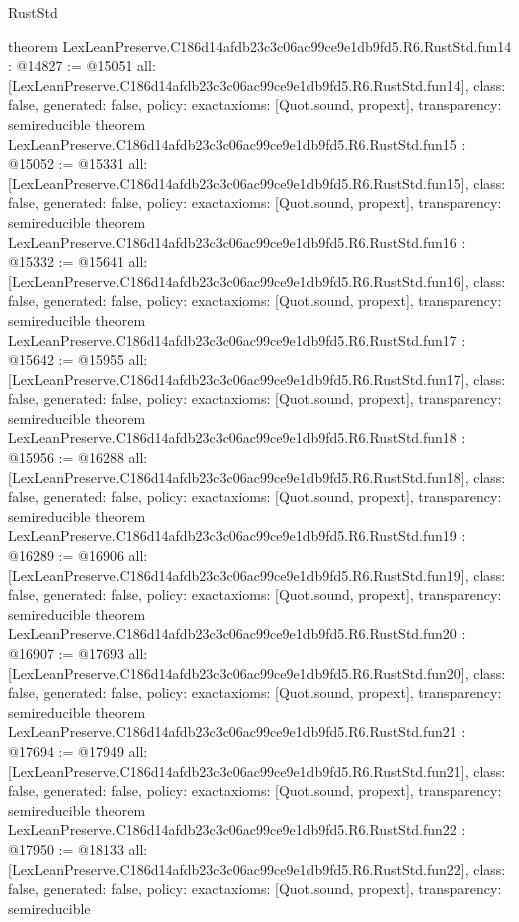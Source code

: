 \begin{lexlean}{RustStd}
\begin{coremodule}
{}
theorem LexLeanPreserve.C186d14afdb23c3c06ac99ce9e1db9fd5.R6.RustStd.fun14 : @14827 := @15051 {
  all: [LexLeanPreserve.C186d14afdb23c3c06ac99ce9e1db9fd5.R6.RustStd.fun14],
  class: false,
  generated: false,
  policy: exact{axioms: [Quot.sound, propext]},
  transparency: semireducible
}
theorem LexLeanPreserve.C186d14afdb23c3c06ac99ce9e1db9fd5.R6.RustStd.fun15 : @15052 := @15331 {
  all: [LexLeanPreserve.C186d14afdb23c3c06ac99ce9e1db9fd5.R6.RustStd.fun15],
  class: false,
  generated: false,
  policy: exact{axioms: [Quot.sound, propext]},
  transparency: semireducible
}
theorem LexLeanPreserve.C186d14afdb23c3c06ac99ce9e1db9fd5.R6.RustStd.fun16 : @15332 := @15641 {
  all: [LexLeanPreserve.C186d14afdb23c3c06ac99ce9e1db9fd5.R6.RustStd.fun16],
  class: false,
  generated: false,
  policy: exact{axioms: [Quot.sound, propext]},
  transparency: semireducible
}
theorem LexLeanPreserve.C186d14afdb23c3c06ac99ce9e1db9fd5.R6.RustStd.fun17 : @15642 := @15955 {
  all: [LexLeanPreserve.C186d14afdb23c3c06ac99ce9e1db9fd5.R6.RustStd.fun17],
  class: false,
  generated: false,
  policy: exact{axioms: [Quot.sound, propext]},
  transparency: semireducible
}
theorem LexLeanPreserve.C186d14afdb23c3c06ac99ce9e1db9fd5.R6.RustStd.fun18 : @15956 := @16288 {
  all: [LexLeanPreserve.C186d14afdb23c3c06ac99ce9e1db9fd5.R6.RustStd.fun18],
  class: false,
  generated: false,
  policy: exact{axioms: [Quot.sound, propext]},
  transparency: semireducible
}
theorem LexLeanPreserve.C186d14afdb23c3c06ac99ce9e1db9fd5.R6.RustStd.fun19 : @16289 := @16906 {
  all: [LexLeanPreserve.C186d14afdb23c3c06ac99ce9e1db9fd5.R6.RustStd.fun19],
  class: false,
  generated: false,
  policy: exact{axioms: [Quot.sound, propext]},
  transparency: semireducible
}
theorem LexLeanPreserve.C186d14afdb23c3c06ac99ce9e1db9fd5.R6.RustStd.fun20 : @16907 := @17693 {
  all: [LexLeanPreserve.C186d14afdb23c3c06ac99ce9e1db9fd5.R6.RustStd.fun20],
  class: false,
  generated: false,
  policy: exact{axioms: [Quot.sound, propext]},
  transparency: semireducible
}
theorem LexLeanPreserve.C186d14afdb23c3c06ac99ce9e1db9fd5.R6.RustStd.fun21 : @17694 := @17949 {
  all: [LexLeanPreserve.C186d14afdb23c3c06ac99ce9e1db9fd5.R6.RustStd.fun21],
  class: false,
  generated: false,
  policy: exact{axioms: [Quot.sound, propext]},
  transparency: semireducible
}
theorem LexLeanPreserve.C186d14afdb23c3c06ac99ce9e1db9fd5.R6.RustStd.fun22 : @17950 := @18133 {
  all: [LexLeanPreserve.C186d14afdb23c3c06ac99ce9e1db9fd5.R6.RustStd.fun22],
  class: false,
  generated: false,
  policy: exact{axioms: [Quot.sound, propext]},
  transparency: semireducible
}
\end{coremodule}
\end{lexlean}
